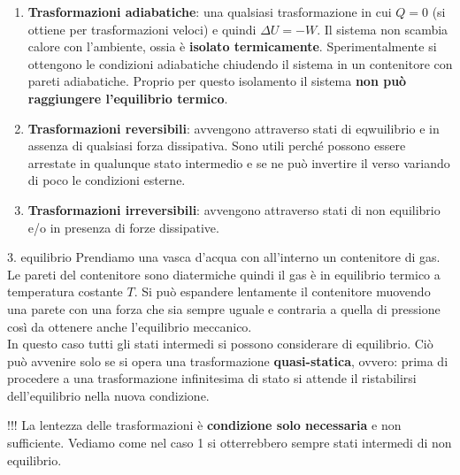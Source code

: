 \documentclass[x11names]{report}
\begin{document}
	
	\begin{enumerate}
		\item \textbf{Trasformazioni adiabatiche}: una qualsiasi trasformazione in cui \(Q = 0\) (si ottiene per trasformazioni veloci) e quindi \(\Delta U = - W\). Il sistema non scambia calore con l'ambiente, ossia è \textbf{isolato termicamente}. Sperimentalmente si ottengono le condizioni adiabatiche chiudendo il sistema in un contenitore con pareti adiabatiche. Proprio per questo isolamento il sistema \textbf{non può raggiungere l'equilibrio termico}.
		\item \textbf{Trasformazioni reversibili}: avvengono attraverso stati di eqwuilibrio e in assenza di qualsiasi forza dissipativa. Sono utili perché possono essere arrestate in qualunque stato intermedio e se ne può invertire il verso variando di poco le condizioni esterne.
		\item \textbf{Trasformazioni irreversibili}: avvengono attraverso stati di non equilibrio e/o in presenza di forze dissipative.
	\end{enumerate}
	
	\begin{es}{3. equilibrio}
		Prendiamo una vasca d'acqua con all'interno un contenitore di gas. Le pareti del contenitore sono diatermiche quindi il gas è in equilibrio termico a temperatura costante \(T\). Si può espandere lentamente il contenitore muovendo una parete con una forza che sia sempre uguale e contraria a quella di pressione così da ottenere anche l'equilibrio meccanico. \\
		
		In questo caso tutti gli stati intermedi si possono considerare di equilibrio. Ciò può avvenire solo se si opera una trasformazione \textbf{quasi-statica}, ovvero: prima di procedere a una trasformazione infinitesima di stato si attende il ristabilirsi dell'equilibrio nella nuova condizione.
		
		\begin{center}
			\colorbox{attenzione}{\begin{minipage}{5in}
					\begin{attenzione}{!!!}
						La lentezza delle trasformazioni è \textbf{condizione solo necessaria} e non sufficiente. Vediamo come nel caso 1 si otterrebbero sempre stati intermedi di non equilibrio.
					\end{attenzione}
			\end{minipage}}
		\end{center}
	\end{es}
	
\end{document}
